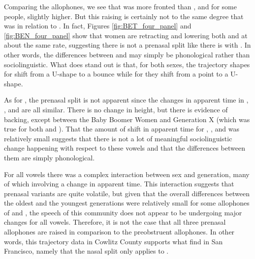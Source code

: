 Comparing the \dress allophones, we see that \ben was more fronted than \bet, and for some people, slightly higher. But this raising is certainly not to the same degree that \ban was in relation to \bat. In fact, Figures \ref{fig:BET_four_panel} and \ref{fig:BEN_four_panel} show that women are retracting and lowering both \bet and \ben at about the same rate, suggesting there is not a prenasal split like there is with \trap. In other words, the differences between \ben and \bet may simply be phonological rather than sociolinguistic. What does stand out is that, for both sexes, the trajectory shapes for \bet shift from a U-shape to a bounce while for \ben they shift from a point to a U-shape.

As for \kit, the prenasal split is not apparent since the changes in apparent time in \bit, \bin, and \bing are all similar. There is no change in height, but there is evidence of backing, except between the Baby Boomer Women and Generation X (which was true for both \bit and \bin). That the amount of shift in apparent time for \bit, \bin, and \bing was relatively small suggests that there is not a lot of meaningful sociolinguistic change happening with respect to these vowels and that the differences between them are simply phonological.

For all vowels there was a complex interaction between sex and generation, many of which involving a change in apparent time. This interaction suggests that prenasal variants are quite volatile, but given that the overall differences between the oldest and the youngest generations were relatively small for some allophones of \dress and \kit, the speech of this community does not appear to be undergoing major changes for all vowels. Therefore, it is not the case that all three prenasal allophones are raised in comparison to the preobstruent allophones. In other words, this trajectory data in Cowlitz County supports what \citep{cardoso_etal_2016_pads} find in San Francisco, namely that the nasal split only applies to \trap.


